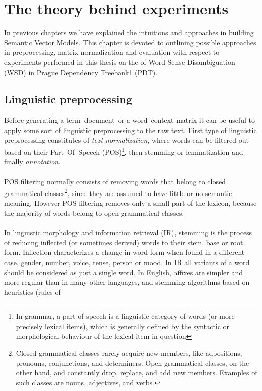 \chapter{The theory behind experiments}
In previous chapters we have explained the intuitions and approaches in building Semantic Vector Models. This chapter is devoted to outlining possible approaches in preprocessing, matrix normalization and evaluation with respect to experiments performed in this thesis on the of Word Sense Disambiguation (WSD) in Prague Dependency Treebank1 (PDT).

\section{Linguistic preprocessing}\label{linguisticPreprocessing}
Before generating a term--document\ or a  word--context matrix it can be useful to apply some sort of linguistic preprocessing to the raw text. First type of  linguistic preprocessing constitutes of \textit{text normalization}, where words can be filtered out based on their Part--Of--Speech (POS)\footnote{In grammar, a part of speech is a linguistic category of words (or more precisely lexical items), which is generally defined by the syntactic or morphological behaviour of the lexical item in question}, then stemming or lemmatization and finally \textit{annotation}.
\\\\  \underline{POS filtering} normally consists of removing words that belong to closed grammatical 
classes\footnote{Closed grammatical classes rarely acquire new members, like adpositions, pronouns, 
conjunctions, and determiners. Open grammatical classes, on the other hand, and constantly drop, replace, 
and add new members. Examples of such classes are nouns, adjectives, and verbs.}, since they are assumed 
to have little or no semantic meaning. However POS filtering removes only a small part of the lexicon, because 
the majority of words belong to open grammatical classes.  
\\\\  In linguistic morphology and information retrieval (IR), \underline{stemming} is the process of 
reducing inflected (or sometimes derived) words to their stem, base or root form. Inflection characterizes 
a change in word form when found in a different case, gender, number, voice, tense, person or mood. In 
IR all variants of a word should be considered as just a single word. In English, affixes are simpler and 
more regular than in many other languages, and stemming algorithms based on heuristics (rules of 
